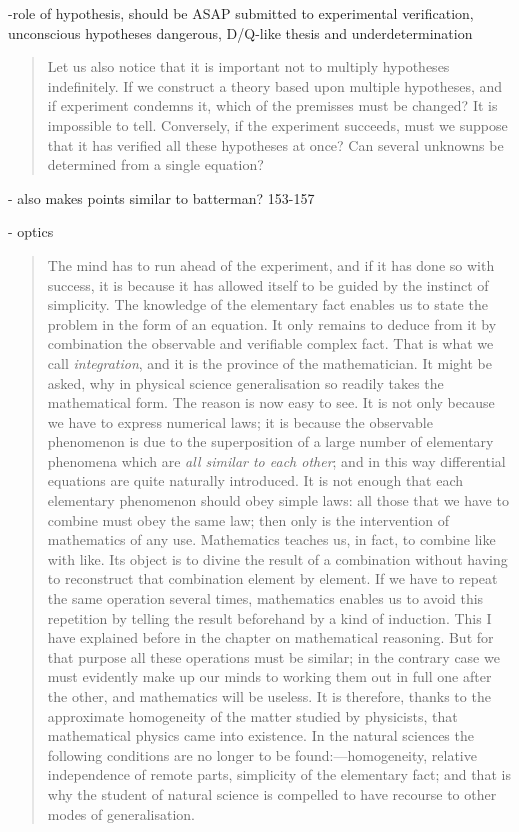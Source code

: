 \documentclass{article}
\begin{document}
 -role of hypothesis, should be ASAP submitted to experimental verification, unconscious hypotheses dangerous, D/Q-like thesis and underdetermination
 
 \begin{quote}
     Let us also notice that it is important not to multiply hypotheses indefinitely.  If we construct a theory based upon multiple hypotheses, and if experiment condemns it, which of the premisses must be changed?  It is impossible to tell.  Conversely, if the experiment succeeds, must we suppose that it has verified all these hypotheses at once?  Can several unknowns be determined from a single equation?  \citep[p. 151-152]{Poincare1952}
 \end{quote}
 
 - also makes points similar to batterman?  153-157
 
 - optics
 
 \begin{quote}
     The mind has to run ahead of the experiment, and if it has done so with success, it is because it has allowed itself to be guided by the instinct of simplicity.  The knowledge of the elementary fact enables us to state the problem in the form of an equation.  It only remains to deduce from it by combination the observable and verifiable complex fact.  That is what we call \emph{integration}, and it is the province of the mathematician.  It might be asked, why in physical science generalisation so readily takes the mathematical form.  The reason is now easy to see.  It is not only because we have to express numerical laws; it is because the observable phenomenon is due to the superposition of a large number of elementary phenomena which are \emph{all similar to each other}; and in this way differential equations are quite naturally introduced.  It is not enough that each elementary phenomenon should obey simple laws: all those that we have to combine must obey the same law; then only is the intervention of mathematics of any use.  Mathematics teaches us, in fact, to combine like with like.  Its object is to divine the result of a combination without having to reconstruct that combination element by element.  If we have to repeat the same operation several times, mathematics enables us to avoid this repetition by telling the result beforehand by a kind of induction.  This I have explained before in the chapter on mathematical reasoning.  But for that purpose all these operations must be similar; in the contrary case we must evidently make up our minds to working them out in full one after the other, and mathematics will be useless.  It is therefore, thanks to the approximate homogeneity of the matter studied by physicists, that mathematical physics came into existence.  In the natural sciences the following conditions are no longer to be found:---homogeneity, relative independence of remote parts, simplicity of the elementary fact; and that is why the student of natural science is compelled to have recourse to other modes of generalisation.  \citep[p. 158-159]{Poincare1952}
 \end{quote}
 
\end{document}
